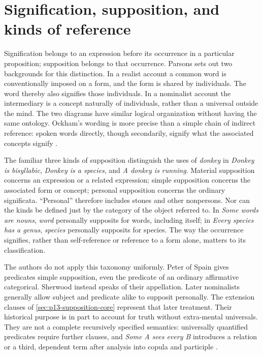 \section{Signification, supposition, and kinds of reference}
\label{sec:p13-supposition-signification}

Signification belongs to an expression before its occurrence in a
particular proposition; supposition belongs to that occurrence. Parsons
sets out two backgrounds for this distinction. In a realist account a
common word is conventionally imposed on a form, and the form is shared
by individuals. The word thereby also signifies those individuals. In a
nominalist account the intermediary is a concept naturally of individuals,
rather than a universal outside the mind. The two diagrams have similar
logical organization without having the same ontology. Ockham's wording
is more precise than a simple chain of indirect reference: spoken words
directly, though secondarily, signify what the associated concepts signify
\cite[pp.~186--188]{Parsons2007FordhamSupposition}.

The familiar three kinds of supposition distinguish the uses of
\emph{donkey} in \emph{Donkey is bisyllabic}, \emph{Donkey is a
species}, and \emph{A donkey is running}. Material supposition concerns
an expression or a related expression; simple supposition concerns the
associated form or concept; personal supposition concerns the ordinary
significata. ``Personal'' therefore includes stones and other nonpersons.
Nor can the kinds be defined just by the category of the object referred
to. In \emph{Some words are nouns}, \emph{word} personally supposits
for words, including itself; in \emph{Every species has a genus},
\emph{species} personally supposits for species. The way the occurrence
signifies, rather than self-reference or reference to a form alone,
matters to its classification.

The authors do not apply this taxonomy uniformly. Peter of Spain gives
predicates simple supposition, even the predicate of an ordinary
affirmative categorical. Sherwood instead speaks of their appellation.
Later nominalists generally allow subject and predicate alike to
supposit personally. The extension clauses of
\cref{sec:p13-supposition-core} represent that later treatment. Their
historical purpose is in part to account for truth without extra-mental
universals. They are not a complete recursively specified semantics:
universally quantified predicates require further clauses, and
\emph{Some A sees every B} introduces a relation or a third, dependent
term after analysis into copula and participle
\cite[pp.~188--189,192--194]{Parsons2007FordhamSupposition}.

